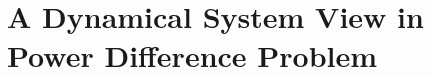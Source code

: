 \section{A Dynamical System View in Power Difference Problem}~\label{sec:a-dynamical-system-view-in-power-difference-problem}
